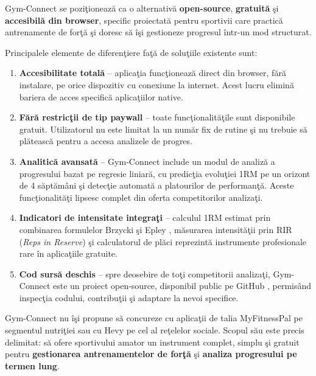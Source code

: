 Gym-Connect se pozi\c tioneaz\u a ca o alternativ\u a \textbf{open-source},
\textbf{gratuit\u a} \c si \textbf{accesibil\u a din browser}, specific
proiectat\u a pentru sportivii care practic\u a antrenamente de for\c t\u a
\c si doresc s\u a \^ i\c si gestioneze progresul \^ intr-un mod structurat.

Principalele elemente de diferen\c tiere fa\c t\u a de solu\c tiile existente sunt:

\begin{enumerate}
  \item \textbf{Accesibilitate total\u a} -- aplica\c tia func\c tioneaz\u a
        direct din browser, f\u ar\u a instalare, pe orice dispozitiv cu
        conexiune la internet. Acest lucru elimin\u a bariera de acces
        specific\u a aplica\c tiilor native.

  \item \textbf{F\u ar\u a restric\c tii de tip paywall} -- toate func\c tionalit\u a\c tile
        sunt disponibile gratuit. Utilizatorul nu este limitat la un num\u ar
        fix de rutine \c si nu trebuie s\u a pl\u ateasc\u a pentru a accesa
        analizele de progres.

  \item \textbf{Analitic\u a avansat\u a} -- Gym-Connect include un modul
        de analiz\u a a progresului bazat pe regresie liniar\u a, cu
        predic\c tia evolu\c tiei 1RM pe un orizont de 4 s\u apt\u am\^ ani
        \c si detec\c tie automat\u a a platourilor de performan\c t\u a.
        Aceste func\c tionalit\u a\c ti lipsesc complet din oferta
        competitorilor analiza\c ti.

  \item \textbf{Indicatori de intensitate integra\c ti} -- calculul
        1RM estimat prin combinarea formulelor Brzycki \c si Epley
        \cite{brzycki1993strength}, m\u asurarea intensit\u a\c tii
        prin RIR (\textit{Reps in Reserve}) \c si calculatorul
        de pl\u aci reprezint\u a instrumente profesionale rare
        \^ in aplica\c tiile gratuite.

  \item \textbf{Cod surs\u a deschis} -- spre deosebire de to\c ti
        competitorii analiza\c ti, Gym-Connect este un proiect
        open-source, disponibil public pe GitHub \cite{gymconnect2026},
        permis\^ and inspec\c tia codului, contribu\c tii \c si
        adaptare la nevoi specifice.
\end{enumerate}

Gym-Connect nu \^ i\c si propune s\u a concureze cu aplica\c tii de talia
MyFitnessPal pe segmentul nutri\c tiei sau cu Hevy pe cel al re\c telelor
sociale. Scopul s\u au este precis delimitat: s\u a ofere sportivului
amator un instrument complet, simplu \c si gratuit pentru
\textbf{gestionarea antrenamentelor de for\c t\u a} \c si \textbf{analiza
progresului pe termen lung}.
